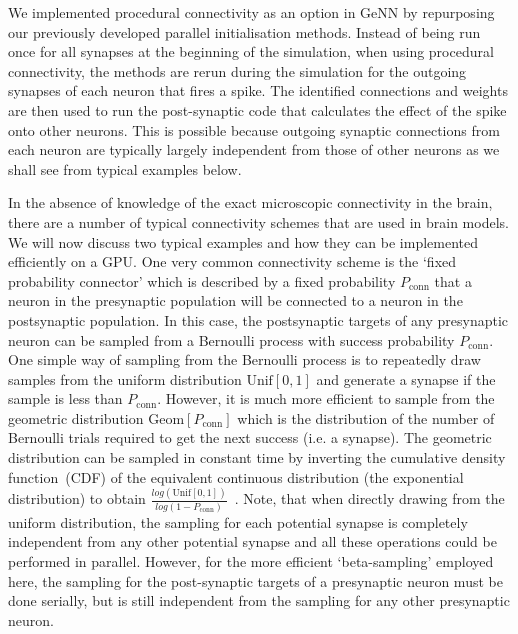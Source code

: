 \documentclass[9pt,twocolumn,twoside,lineno]{pnas-new}
\begin{document}
We implemented procedural connectivity as an option in GeNN by repurposing our previously developed parallel initialisation methods.
Instead of being run once for all synapses at the beginning of the simulation, when using procedural connectivity, the methods are rerun during the simulation for the outgoing synapses of each neuron that fires a spike.
The identified connections and weights are then used to run the post-synaptic code that calculates the effect of the spike onto other neurons.
This is possible because outgoing synaptic connections from each neuron are typically largely independent from those of other neurons as we shall see from typical examples below.

In the absence of knowledge of the exact microscopic connectivity in the brain, there are a number of typical connectivity schemes that are used in brain models.
We will now discuss two typical examples and how they can be implemented efficiently on a GPU.
One very common connectivity scheme is the `fixed probability connector' which is described by a fixed probability $P_{\text{conn}}$ that a neuron in the presynaptic population will be connected to a neuron in the postsynaptic population.
In this case, the postsynaptic targets of any presynaptic neuron can be sampled from a Bernoulli process with success probability $P_{\text{conn}}$.
One simple way of sampling from the Bernoulli process is to repeatedly draw samples from the uniform distribution $\text{Unif}[0, 1]$ and generate a synapse if the sample is less than $P_{\text{conn}}$.
However, it is much more efficient to sample from the geometric distribution $\text{Geom}[P_{\text{conn}}]$ which is the distribution of the number of Bernoulli trials required to get the next success (i.e. a synapse).
The geometric distribution can be sampled in constant time by inverting the cumulative density function~(CDF) of the equivalent continuous distribution (the exponential distribution) to obtain $\frac{log(\text{Unif}[0, 1])}{log(1 - P_{\text{conn}})}$~\citep[p499]{DevroyeLuc2013}.
Note, that when directly drawing from the uniform distribution, the sampling for each potential synapse is completely independent from any other potential synapse and all these operations could be performed in parallel.
However, for the more efficient `beta-sampling' employed here, the sampling for the post-synaptic targets of a presynaptic neuron must be done serially, but is still independent from the sampling for any other presynaptic neuron.
\end{document}

